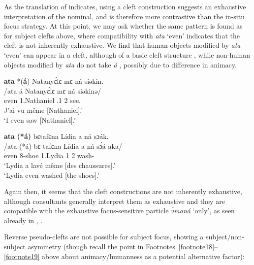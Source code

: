 \documentclass[output=paper,colorlinks,citecolor=brown
]{langscibook}
\begin{document}
As the translation of  indicates, using a cleft construction suggests an exhaustive interpretation of the nominal, and is therefore more contrastive than the in-situ focus strategy. At this point, we may ask whether the same pattern is found as for subject clefts above, where compatibility with \textit{ata} `even' indicates that the cleft is not inherently exhaustive. We find that human objects modified by \textit{ata} `even'  can appear in a cleft, although of a basic cleft structure , while non-human objects modified by \textit{ata} do not take \textit{á} , possibly due to difference in animacy.

\ea \label{evenobjset}
\ea
\label{evenobjNat}
\glll
{\db}\textbf{ata} *(\textbf{á}) Natanyɛ́lɛ mɛ ná siəkin. \\
/ata á Natanyɛ́lɛ mɛ ná siəkinə/ \\
{\db}even \COP{} 1.Nathaniel \SM{}.1\SG{} \PST{}2{} see.\DUR{} \\
\glt
J'ai vu même [Nathaniel]\textsubscript{\FOC{}}.' \\ `I even saw [Nathaniel]\textsubscript{\FOC{}}.' \jambox*{[PM 2276]}

\ex
\label{evenobjshoes}
\glll
{\db}\textbf{ata}	\textbf{(*á)}	bɛtafɛna	Lídia	a ná	sɔák. \\
/ata	(*á)	bɛ-tafɛna	Lídia	a ná	sɔ́á-aka/ \\
{\db}even	\COP{}	8-shoe	1.Lydia	1\SM{} \PST{}2{}	wash-\DUR{} \\
\glt
`Lydia a lavé même [des chaussures]\textsubscript{\FOC{}}.' \\ `Lydia even washed [the shoes]\textsubscript{\FOC{}}.' \jambox*{[PM 2268] }

\z
\z
 
Again then, it seems that the cleft constructions are not inherently exhaustive, although consultants generally interpret them as exhaustive and they are compatible with the exhaustive focus-sensitive particle \textit{ɔ́maná} `only', as seen already in , .

Reverse pseudo-clefts are not possible for subject focus, showing a subject\slash non-subject asymmetry (though recall the point in Footnotes~\ref{footnote18}--\ref{footnote19} above about animacy\slash humanness as a potential alternative factor):
\end{document}
